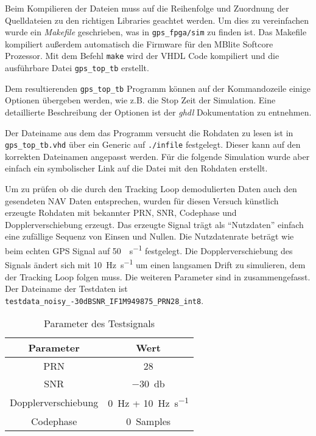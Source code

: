 Beim Kompilieren der Dateien muss auf die Reihenfolge und Zuordnung der Quelldateien zu den richtigen Libraries geachtet werden. Um dies zu vereinfachen wurde ein \emph{Makefile} geschrieben, was in \lstinline$gps_fpga/sim$ zu finden ist. Das Makefile kompiliert außerdem automatisch die Firmware für den MBlite Softcore Prozessor. Mit dem Befehl \lstinline$make$ wird der VHDL Code kompiliert und die ausführbare Datei \lstinline$gps_top_tb$ erstellt.

Dem resultierenden \lstinline$gps_top_tb$ Programm können auf der Kommandozeile einige Optionen übergeben werden, wie z.B. die Stop Zeit der Simulation. Eine detaillierte Beschreibung der Optionen ist der \emph{ghdl} Dokumentation zu entnehmen.

Der Dateiname aus dem das Programm versucht die Rohdaten zu lesen ist in \lstinline$gps_top_tb.vhd$ über ein Generic auf \lstinline$./infile$ festgelegt. Dieser kann auf den korrekten Dateinamen angepasst werden. Für die folgende Simulation wurde aber einfach ein symbolischer Link auf die Datei mit den Rohdaten erstellt.

Um zu prüfen ob die durch den Tracking Loop demodulierten Daten auch den gesendeten NAV Daten entsprechen, wurden für diesen Versuch künstlich erzeugte Rohdaten mit bekannter PRN, SNR, Codephase und Dopplerverschiebung erzeugt.
Das erzeugte Signal trägt als \enquote{Nutzdaten} einfach eine zufällige Sequenz von Einsen und Nullen. Die Nutzdatenrate beträgt wie beim echten GPS Signal auf \SI{50}{\bit\per\second} festgelegt. Die Dopplerverschiebung des Signals ändert sich mit \SI{10}{\hertz\per\second} um einen langsamen Drift zu simulieren, dem der Tracking Loop folgen muss. Die weiteren Parameter sind in  zusammengefasst. Der Dateiname der Testdaten ist \lstinline$testdata_noisy_-30dBSNR_IF1M949875_PRN28_int8$.

\begin{table}[htbp]
    \ttabbox
    {
        \caption[Testsignal Parameter]{Parameter des Testsignals}
        \label{TrackingVersuchTestsignalParameter}
    }
    {
    \begin{tabular}{c c}
        \toprule
        Parameter               & Wert \\
        \midrule
        PRN	                    & \num{28} \\
        SNR               & \SI{-30}{\decibel} \\
        Dopplerverschiebung     & \SI{0}{\hertz} + \SI{10}{\hertz\per\second}\\
        Codephase               & \SI{0}{Samples} \\
        \bottomrule
    \end{tabular}
}
\end{table}


